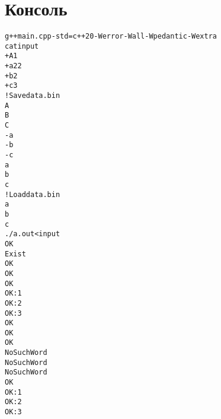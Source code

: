 \section{Консоль}
\begin{alltt}
g++ main.cpp -std=c++20 -Werror -Wall -Wpedantic -Wextra
cat input
+ A 1
+ a 22
+ b 2
+ c 3
! Save data.bin
A
B
C
- a
- b
- c
a
b
c
! Load data.bin
a
b
c
./a.out < input
OK
Exist
OK
OK
OK
OK: 1
OK: 2
OK: 3
OK
OK
OK
NoSuchWord
NoSuchWord
NoSuchWord
OK
OK: 1
OK: 2
OK: 3
\end{alltt}
\pagebreak

